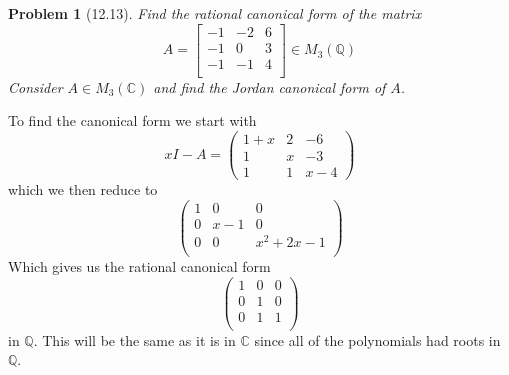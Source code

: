 \documentclass[10pt]{article}
\newcommand{\sk}{\vskip 10mm}
\newcommand{\bb}[1]{\mathbb{#1}}
\theoremstyle{plain}
\newtheorem{problem}{Problem}
\theoremstyle{remark}
\begin{document}
\sk

\begin{problem}[12.13]
  Find the rational canonical form of the matrix
  \[
    A = 
    \left[
      \begin{array}{ccc}
        -1&-2&6\\
        -1&0&3\\
        -1&-1&4\\
      \end{array}
    \right] \in M_3(\bb{Q})
  \]
  Consider $A\in M_3(\bb{C})$ and find the Jordan canonical form of $A$.
\end{problem}

To find the canonical form we start with
\[ xI-A = 
  \left(
    \begin{array}{ccc}
      1+x&2&-6\\
      1&x&-3\\
      1&1&x-4
    \end{array}
  \right)\]
which we then reduce to
\[
  \left(
    \begin{array}{ccc}
      1&0&0\\
      0&x-1&0\\
      0&0&x^2+2x-1\\
    \end{array}
  \right)
\]
Which gives us the rational canonical form
\[
  \left(
    \begin{array}{ccc}
      1&0&0\\
      0&1&0\\
      0&1&1\\
    \end{array}
  \right)
\]
in $\bb{Q}$. This will be the same as it is in $\bb{C}$
since all of the polynomials had roots in $\bb{Q}$.

\sk

\end{document}
